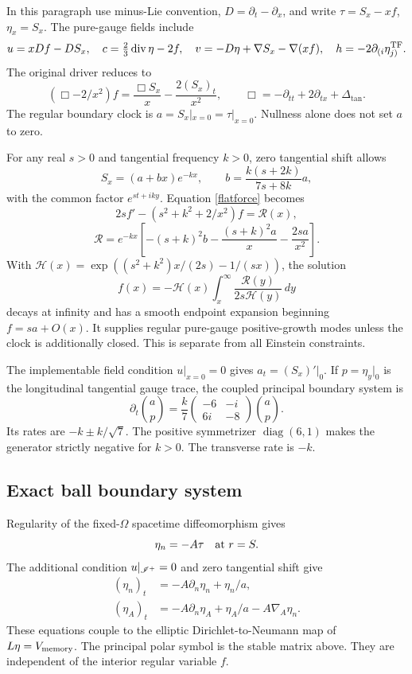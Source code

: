 In this paragraph use minus-Lie convention, $D=\partial_t-\partial_x$, and write $\tau=S_x-xf$, $\eta_x=S_x$. The pure-gauge fields include
\[
 u=xDf-DS_x,\quad c=\tfrac23\operatorname{div}\eta-2f,\quad
 v=-D\eta+\nabla S_x-\nabla(xf),\quad h=-2\partial_{(i}\eta_{j)}^{\mathrm{TF}}.
\]
The original driver reduces to
\begin{equation}
 \left(\Box-2/x^2\right)f=\frac{\Box S_x}{x}-\frac{2(S_x)_t}{x^2},
 \qquad \Box=-\partial_{tt}+2\partial_{tx}+\Delta_{\tan}.\label{flatforce}
\end{equation}
The regular boundary clock is $a=S_x|_{x=0}=\tau|_{x=0}$. Nullness alone does not set $a$ to zero.

For any real $s>0$ and tangential frequency $k>0$, zero tangential shift allows
\[
 S_x=(a+bx)e^{-kx},\qquad b=\frac{k(s+2k)}{7s+8k}a,
\]
with the common factor $e^{st+iky}$. Equation \eqref{flatforce} becomes
\[
 2s f'-(s^2+k^2+2/x^2)f=\mathcal R(x),
\]
\[
 \mathcal R=e^{-kx}\left[-(s+k)^2b-\frac{(s+k)^2a}{x}-\frac{2sa}{x^2}\right].
\]
With $\mathcal H(x)=\exp((s^2+k^2)x/(2s)-1/(sx))$, the solution
\[
 f(x)=-\mathcal H(x)\int_x^\infty\frac{\mathcal R(y)}{2s\mathcal H(y)}\,dy
\]
decays at infinity and has a smooth endpoint expansion beginning $f=sa+O(x)$. It supplies regular pure-gauge positive-growth modes unless the clock is additionally closed. This is separate from all Einstein constraints.

The implementable field condition $u|_{x=0}=0$ gives $a_t=(S_x)'|_{0}$. If $p=\eta_y|_0$ is the longitudinal tangential gauge trace, the coupled principal boundary system is
\[
 \partial_t\binom ap=\frac{k}{7}
 \begin{pmatrix}-6&-i\\6i&-8\end{pmatrix}\binom ap.
\]
Its rates are $-k\pm k/\sqrt7$. The positive symmetrizer $\operatorname{diag}(6,1)$ makes the generator strictly negative for $k>0$. The transverse rate is $-k$.

\subsection{Exact ball boundary system}
Regularity of the fixed-$\Omega$ spacetime diffeomorphism gives
\[
 \eta_n=-A\tau\quad\hbox{at }r=S.
\]
The additional condition $u|_{\mathscr I^+}=0$ and zero tangential shift give
\begin{align}
 (\eta_n)_t&=-A\partial_n\eta_n+\eta_n/a,\\
 (\eta_A)_t&=-A\partial_n\eta_A+\eta_A/a-A\nabla_A\eta_n.
\end{align}
These equations couple to the elliptic Dirichlet-to-Neumann map of $L\eta=V_{\rm memory}$. The principal polar symbol is the stable matrix above. They are independent of the interior regular variable $f$.

